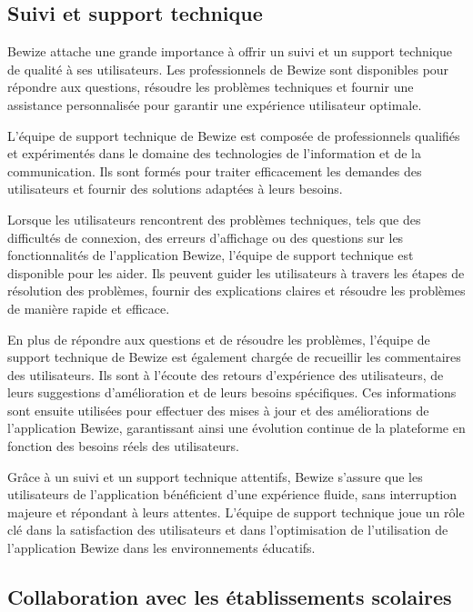 \subsection{Suivi et support technique}
    
   Bewize attache une grande importance à offrir un suivi et un support technique de qualité à ses utilisateurs. Les professionnels de Bewize sont disponibles pour répondre aux questions, résoudre les problèmes techniques et fournir une assistance personnalisée pour garantir une expérience utilisateur optimale.

    L'équipe de support technique de Bewize est composée de professionnels qualifiés et expérimentés dans le domaine des technologies de l'information et de la communication. Ils sont formés pour traiter efficacement les demandes des utilisateurs et fournir des solutions adaptées à leurs besoins.
    
    Lorsque les utilisateurs rencontrent des problèmes techniques, tels que des difficultés de connexion, des erreurs d'affichage ou des questions sur les fonctionnalités de l'application Bewize, l'équipe de support technique est disponible pour les aider. Ils peuvent guider les utilisateurs à travers les étapes de résolution des problèmes, fournir des explications claires et résoudre les problèmes de manière rapide et efficace.
    
    En plus de répondre aux questions et de résoudre les problèmes, l'équipe de support technique de Bewize est également chargée de recueillir les commentaires des utilisateurs. Ils sont à l'écoute des retours d'expérience des utilisateurs, de leurs suggestions d'amélioration et de leurs besoins spécifiques. Ces informations sont ensuite utilisées pour effectuer des mises à jour et des améliorations de l'application Bewize, garantissant ainsi une évolution continue de la plateforme en fonction des besoins réels des utilisateurs.
    
    Grâce à un suivi et un support technique attentifs, Bewize s'assure que les utilisateurs de l'application bénéficient d'une expérience fluide, sans interruption majeure et répondant à leurs attentes. L'équipe de support technique joue un rôle clé dans la satisfaction des utilisateurs et dans l'optimisation de l'utilisation de l'application Bewize dans les environnements éducatifs.
    
\subsection{Collaboration avec les établissements scolaires}
    
